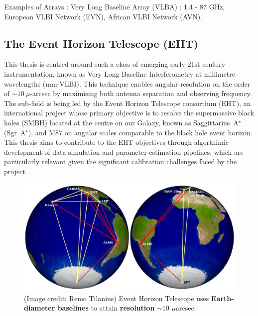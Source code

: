 
Examples of Arrays : Very Long Baseline Array (VLBA) : 1.4 - 87 GHz, European VLBI Network (EVN), African VLBI Network (AVN).  

\subsection{The Event Horizon Telescope (EHT)}
This thesis is centred around such a class of emerging early 21st century instrumentation, known as Very Long Baseline Interferometry at millimetre wavelengths (mm-VLBI). This technique enables angular resolution on the order of $\sim 10\ \mu$-arcsec by maximising both antenna separation and observing frequency. The sub-field is being led by the Event Horizon Telescope consortium (EHT), an international project whose primary objective is to resolve the supermassive black holes  (SMBH) located at the centre on our Galaxy, known as Saggittarius~A$^\star$ (Sgr~A$^\star$), and M87 on angular scales comparable to the black hole event horizon. This thesis aims to contribute to the EHT objectives through algorthimic development of data simulation and parameter estimation pipelines, which are particularly relevant given the significant calibration challenges faced by the project.

\begin{figure}
\begin{center}
\includegraphics[width=\columnwidth]{Images/eht_globe}
\caption{(Image credit: Remo Tilanius) Event Horizon Telescope uses \textbf{Earth-diameter baselines} to attain \textbf{resolution} \boldmath$\sim 10$ $\mu$arcsec. \label{fig:eht_globe}%
}
\end{center}
\end{figure}

